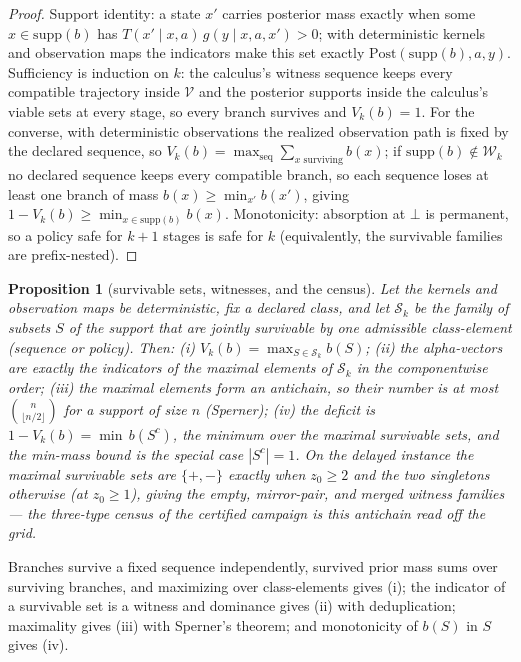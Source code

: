 \documentclass[10pt,twocolumn]{article}
\theoremstyle{plain}
\newtheorem{proposition}[theorem]{Proposition}
\theoremstyle{definition}
\theoremstyle{remark}
\begin{document}
\begin{proof}
Support identity: a state \(x'\) carries posterior mass exactly when
some \(x \in \mathrm{supp}(b)\) has
\(T(x' \mid x, a)\, g(y \mid x, a, x') > 0\); with deterministic
kernels and observation maps the indicators make this set exactly
\(\mathrm{Post}(\mathrm{supp}(b), a, y)\). Sufficiency is induction on
\(k\): the calculus's witness sequence keeps every compatible trajectory
inside \(\mathcal{V}\) and the posterior supports inside the calculus's
viable sets at every stage, so every branch survives and
\(V_{k}(b) = 1\). For the converse, with deterministic observations the
realized observation path is fixed by the declared sequence, so
\(V_{k}(b) = \max_{\text{seq}} \sum_{x \text{ surviving}} b(x)\); if
\(\mathrm{supp}(b) \notin \mathcal{W}_{k}\) no declared sequence keeps
every compatible branch, so each sequence loses at least one branch of
mass \(b(x) \ge \min_{x'} b(x')\), giving
\(1 - V_{k}(b) \ge \min_{x \in \mathrm{supp}(b)} b(x)\). Monotonicity:
absorption at \(\bot\) is permanent, so a policy safe for \(k+1\)
stages is safe for \(k\) (equivalently, the survivable families are
prefix-nested).
\end{proof}

\begin{proposition}[survivable sets, witnesses, and the census]\label{prop:antichain}
Let the kernels and observation maps be deterministic, fix a declared
class, and let \(\mathcal{S}_{k}\) be the family of subsets
\(S\) of the support that are jointly survivable by one admissible
class-element (sequence or policy). Then:
(i) \(V_{k}(b) = \max_{S \in \mathcal{S}_{k}} b(S)\);
(ii) the alpha-vectors are exactly the indicators of the maximal elements
of \(\mathcal{S}_{k}\) in the componentwise order;
(iii) the maximal elements form an antichain, so their number is at
most \(\binom{n}{\lfloor n/2 \rfloor}\) for a support of size
\(n\) (Sperner);
(iv) the deficit is \(1 - V_{k}(b) = \min \, b(S^{c})\), the minimum
over the maximal survivable sets, and the min-mass bound is the special
case \(|S^{c}| = 1\).
On the delayed instance the maximal survivable sets are
\(\{+, -\}\) exactly when \(z_{0} \ge 2\) and the two singletons
otherwise (at \(z_{0} \ge 1\)), giving the empty, mirror-pair, and
merged witness families --- the three-type census of the certified campaign
is this antichain read off the grid.
\end{proposition}

Branches survive a fixed sequence independently, survived prior mass sums
over surviving branches, and maximizing over class-elements gives (i);
the indicator of a survivable set is a witness and dominance gives (ii)
with deduplication; maximality gives (iii) with Sperner's theorem; and
monotonicity of \(b(S)\) in \(S\) gives (iv).
\end{document}
